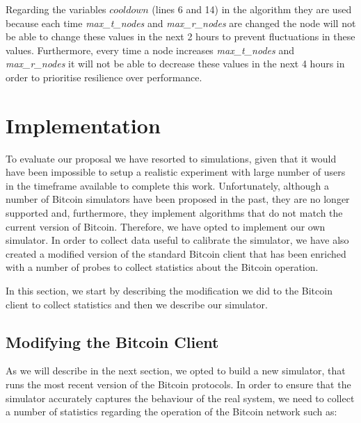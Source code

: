 Regarding the variables $cooldown$ (lines 6 and 14) in the algorithm they are used because each time \textsl{max\_t\_nodes} and \textsl{max\_r\_nodes} are changed the node will not be able to change these values in the next 2 hours to prevent fluctuations in these values. Furthermore, every time a node increases \textsl{max\_t\_nodes} and \textsl{max\_r\_nodes} it will not be able to decrease these values in the next 4 hours in order to prioritise resilience over performance. 


\section{Implementation}
\label{sec:imp}

To evaluate our proposal we have resorted to simulations, given that it would have been impossible to setup a realistic experiment with large number of users in the timeframe available to complete this work. Unfortunately, although a number of Bitcoin simulators have been proposed in the past, they are no longer supported and, furthermore, they implement algorithms that do not match the current version of Bitcoin. Therefore, we have opted to implement our own simulator. In order to collect data useful to calibrate the simulator, we have also created a modified version of the standard Bitcoin client that has been enriched with a number of probes to collect statistics about the Bitcoin operation.

In this section, we start by describing the modification we did to the Bitcoin client to collect statistics and then we describe our simulator.



\subsection{Modifying the Bitcoin Client}

As we will describe in the next section, we opted to build a new simulator, that runs the most recent version of the Bitcoin protocols. In order to ensure that the simulator accurately captures the behaviour of the real system, we need to collect a number of statistics regarding the operation of the Bitcoin network such as:

